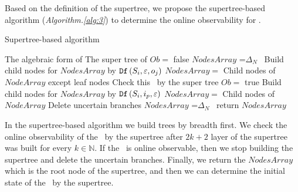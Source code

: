Based on the definition of the supertree, we propose the supertree-based algorithm ({\em Algorithm.\ref{alg:3}}) to determine the online observability for \BCNs. 
\begin{algorithm}[h]
\caption{Supertree-based algorithm}
\begin{algorithmic}[1]
\REQUIRE 
The algebraic form of \BCN
\ENSURE  
The super tree of \BCN
\STATE  $Ob=$ false %
\STATE  $NodesArray$ =$\Delta_N$\
\STATE Build child nodes for $NodesArray$ by ${\tt Df}\left(S_i,\varepsilon, o_j\right)$
\STATE $NodesArray=$ Child nodes of $NodeArray$ except leaf nodes
\STATE Check this \BCN\ by the super tree
\STATE $Ob=$ true
\ELSE
\STATE Build child nodes for $NodesArray$ by ${\tt Df}\left(S_i,i_p,\varepsilon\right)$
\STATE $NodesArray=$ Child nodes of $NodeArray$
\ENDIF
\ENDWHILE
\STATE Delete uncertain branches
\STATE  $NodesArray$ =$\Delta_N$\
\STATE return $NodesArray$
\end{algorithmic}
 \label{alg:3}
\end{algorithm}

In the supertree-based algorithm we build trees by breadth first. We check the online observability of the \BCN\ by the supertree after $2k+2$ layer of the supertree was built for every $k\in  \mathbb{N}$. If the \BCN\ is online observable, then we stop building the supertree and delete the uncertain branches. Finally, we return the $NodesArray$ which is the root node of the supertree, and then we can determine the initial state of the \BCN\ by the supertree.

